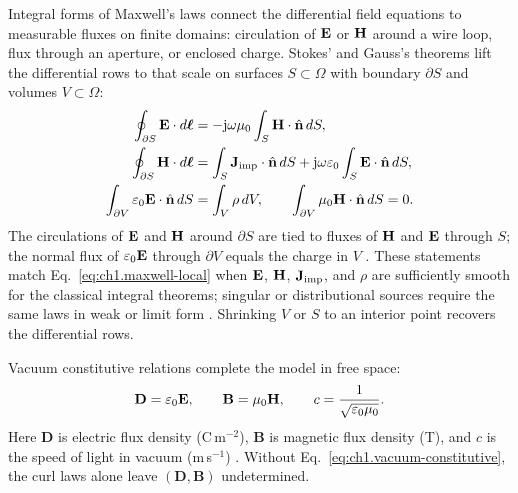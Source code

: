 Integral forms of Maxwell's laws connect the differential field equations to measurable fluxes on finite domains: circulation of $\mathbf{E}$ or $\mathbf{H}$ around a wire loop, flux through an aperture, or enclosed charge. Stokes' and Gauss's theorems lift the differential rows to that scale on surfaces $S\subset\Omega$ with boundary $\partial S$ and volumes $V\subset\Omega$:
\begin{equation}
\label{eq:ch1.maxwell-integral}
\begin{aligned}
\oint_{\partial S}\mathbf{E}\cdot d\boldsymbol{\ell}
&=-\mathrm{j}\omega\mu_0\int_S\mathbf{H}\cdot\hat{\mathbf{n}}\,dS,\\
\oint_{\partial S}\mathbf{H}\cdot d\boldsymbol{\ell}
&=\int_S\mathbf{J}_{\mathrm{imp}}\cdot\hat{\mathbf{n}}\,dS
+\mathrm{j}\omega\varepsilon_0\int_S\mathbf{E}\cdot\hat{\mathbf{n}}\,dS,\\
\int_{\partial V}\varepsilon_0\mathbf{E}\cdot\hat{\mathbf{n}}\,dS
&=\int_V\rho\,dV,\qquad
\int_{\partial V}\mu_0\mathbf{H}\cdot\hat{\mathbf{n}}\,dS=0.
\end{aligned}
\end{equation}
The circulations of $\mathbf{E}$ and $\mathbf{H}$ around $\partial S$ are tied to fluxes of $\mathbf{H}$ and $\mathbf{E}$ through $S$; the normal flux of $\varepsilon_0\mathbf{E}$ through $\partial V$ equals the charge in $V$ \cite{stratton1941}. These statements match Eq.~\eqref{eq:ch1.maxwell-local} when $\mathbf{E}$, $\mathbf{H}$, $\mathbf{J}_{\mathrm{imp}}$, and $\rho$ are sufficiently smooth for the classical integral theorems; singular or distributional sources require the same laws in weak or limit form \cite{stratton1941}. \label{prop:ch1.local-integral-equivalence}
Shrinking $V$ or $S$ to an interior point recovers the differential rows.

Vacuum constitutive relations complete the model in free space:
\begin{equation}
\label{eq:ch1.vacuum-constitutive}
\mathbf{D}=\varepsilon_0\mathbf{E},\qquad
\mathbf{B}=\mu_0\mathbf{H},\qquad
c=\frac{1}{\sqrt{\varepsilon_0\mu_0}}.
\end{equation}
Here $\mathbf{D}$ is electric flux density (C\,m$^{-2}$), $\mathbf{B}$ is magnetic flux density (T), and $c$ is the speed of light in vacuum (m\,s$^{-1}$) \cite{stratton1941}. Without Eq.~\eqref{eq:ch1.vacuum-constitutive}, the curl laws alone leave $(\mathbf{D},\mathbf{B})$ undetermined.

